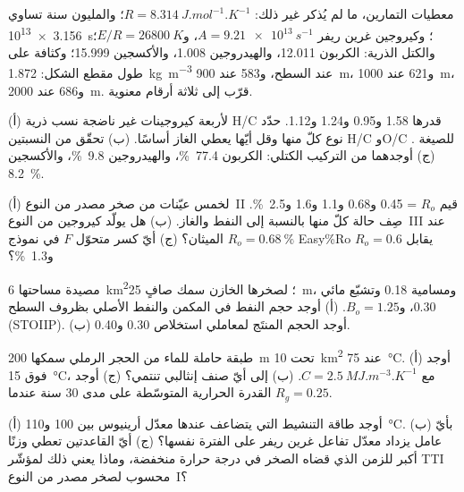 معطيات التمارين، ما لم يُذكر غير ذلك: $R = \qty{8.314}{J.mol^{-1}.K^{-1}}$؛ والمليون
سنة تساوي \qty{3.156e13}{s}؛ وكيروجين غرين ريفر $A = \qty{9.21e13}{s^{-1}}$، و$E/R = \qty{26800}{K}$؛
والكتل الذرية: الكربون 12.011، والهيدروجين 1.008، والأكسجين 15.999؛ وكثافة  على طول مقطع الشكل:
\qty{1.872}{kg.m^{-3}} عند السطح، و583 عند \qty{900}{m}، و621 عند \qty{1000}{m}، و686 عند
\qty{2000}{m}. قرّب إلى ثلاثة أرقام معنوية.

\begin{exercise}[$\star$]\label{exo:b2:energy-geology:1}
(أ) لأربعة كيروجينات غير ناضجة نسب ذرية H/C قدرها 1.58 و0.95 و1.24 و1.12. حدّد نوع كلّ منها وقل
أيّها يعطي الغاز أساسًا. (ب) تحقّق من النسبتين H/C وO/C للصيغة
. (ج) أوجدهما من التركيب الكتلي: الكربون \qty{77.4}{\percent}، والهيدروجين
\qty{9.8}{\percent}، والأكسجين \qty{8.2}{\percent}.
\end{exercise}

\begin{exercise}[$\star$]\label{exo:b2:energy-geology:2}
(أ) لخمس عيّنات من صخر مصدر من النوع~II قيم $R_o$ = 0.45 و0.68 و1.1 و1.6 و\qty{2.5}{\percent}.
صِف حالة كلّ منها بالنسبة إلى النفط والغاز. (ب) هل يولّد كيروجين من النوع~III عند $R_o =
\qty{0.68}{\percent}$ الميثان؟ (ج) أيّ كسر متحوّل $F$ في نموذج Easy\%Ro يقابل
$R_o = 0.6$ و\qty{1.3}{\percent}؟
\end{exercise}

\begin{exercise}[$\star$]\label{exo:b2:energy-geology:3}
مصيدة مساحتها \qty{6}{km^2}؛ لصخرها الخازن سمك صافٍ \qty{25}{m}، ومسامية 0.18 وتشبّع
مائي 0.30، و$B_o = 1.25$. (أ) أوجد حجم النفط في المكمن والنفط الأصلي بظروف السطح (STOIIP). (ب) أوجد
الحجم المنتَج لمعاملي استخلاص 0.30 و0.40.
\end{exercise}

\begin{exercise}[$\star$]\label{exo:b2:energy-geology:4}
طبقة حاملة للماء من الحجر الرملي سمكها \qty{200}{m} تحت \qty{10}{km^2} عند \qty{75}{\celsius}. (أ) أوجد
 فوق \qty{15}{\celsius}، مع $C = \qty{2.5}{MJ.m^{-3}.K^{-1}}$. (ب) إلى أيّ
صنف إنثالبي تنتمي؟ (ج) أوجد القدرة الحرارية المتوسّطة على مدى 30 سنة عندما $R_g = 0.25$.
\end{exercise}

\begin{exercise}[$\star\star$]\label{exo:b2:energy-geology:5}
(أ) أوجد طاقة التنشيط التي يتضاعف عندها معدّل أرينيوس بين 100
و\qty{110}{\celsius}. (ب) بأيّ عامل يزداد معدّل تفاعل غرين ريفر على الفترة
نفسها؟ (ج) أيّ القاعدتين تعطي وزنًا أكبر للزمن الذي قضاه الصخر في درجة حرارة منخفضة،
وماذا يعني ذلك لمؤشّر TTI محسوب لصخر مصدر من النوع~I؟
\end{exercise}

